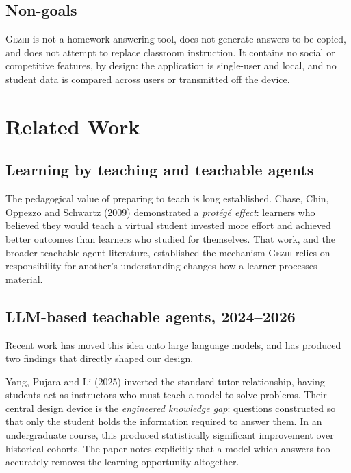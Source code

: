 \documentclass[11pt,a4paper]{article}
\newcommand{\gezhi}{\textsc{Gezhi}}
\begin{document}
\subsection{Non-goals}

\gezhi{} is not a homework-answering tool, does not generate answers to be copied, and does
not attempt to replace classroom instruction. It contains no social or competitive features,
by design: the application is single-user and local, and no student data is compared across
users or transmitted off the device.

\section{Related Work}

\subsection{Learning by teaching and teachable agents}

The pedagogical value of preparing to teach is long established. Chase, Chin, Oppezzo and
Schwartz (2009) demonstrated a \emph{protégé effect}: learners who believed they would teach
a virtual student invested more effort and achieved better outcomes than learners who
studied for themselves. That work, and the broader teachable-agent literature, established
the mechanism \gezhi{} relies on --- responsibility for another's understanding changes how
a learner processes material.

\subsection{LLM-based teachable agents, 2024--2026}

Recent work has moved this idea onto large language models, and has produced two findings
that directly shaped our design.

Yang, Pujara and Li (2025) inverted the standard tutor relationship, having students act as
instructors who must teach a model to solve problems. Their central design device is the
\emph{engineered knowledge gap}: questions constructed so that only the student holds the
information required to answer them. In an undergraduate course, this produced statistically
significant improvement over historical cohorts. The paper notes explicitly that a model
which answers too accurately removes the learning opportunity altogether.
\end{document}
